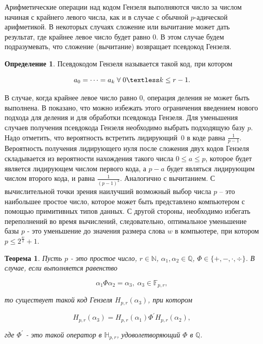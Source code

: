 \documentclass[master, och, diploma, times]{sty/SCWorks}
\theoremstyle{plain}
\newtheorem{thethm}{Теорема}[section]
\theoremstyle{definition}
\newtheorem{defn}{Определение}[section]
\numberwithin{equation}{section}
\begin{document}
Арифметические операции над кодом Гензеля выполняются число за числом начиная с крайнего левого числа, как и в случае с обычной $p$-адической арифметикой. В некоторых случаях сложение или вычитание может дать результат, где крайнее левое число будет равно $0$. В этом случае будем подразумевать, что сложение (вычитание) возвращает псевдокод Гензеля.

\begin{defn}
Псевдокодом Гензеля называется такой код, при котором

\begin{equation}
a_0=\dots=a_k \; \forall \; 0 \textless k \leq r-1.
\end{equation}

\end{defn}

В случае, когда крайнее левое число равно $0$, операция деления не может быть выполнена. В \cite{bib:numbers:limongelli} показано, что можно избежать этого ограничения \mbox{введением} нового подхода для деления и для обработки псевдокода \mbox{Гензеля}.
Для уменьшения случаев получения псевдокода Гензеля \mbox{необходимо} выбрать подходящую базу $p$. Надо отметить, что вероятность встретить \mbox{лидирующий $0$} в коде равна $\frac{1}{p-1}$. Вероятность получения лидирующего нуля после \mbox{сложения} двух кодов Гензеля складывается из вероятности нахождения такого числа $0 \leq a \leq p$, которое будет является лидирующем числом первого кода, а $p-a$ будет являться лидирующим числом второго кода, и равна $\frac{1}{{(p-1)}^{2}}$. Аналогично с вычитанием. С вычислительной точки зрения наилучший возможный выбор числа $p$ -- это наибольшее простое число, которое может быть представлено компьютером с помощью примитивных типов данных. С другой стороны, необходимо избегать переполнений во время вычислений, следовательно, оптимальное уменьшение базы $p$ - это уменьшение до значения размера слова $w$ в компьютере, при котором $p \leq 2^\frac{w}{2}+1$.

\begin{thethm}\label{th:hensel}
Пусть $p$ - это простое число, $r \in \mathbb{N}$, $\alpha_1, \alpha_2 \in \mathbb{Q}$, $\Phi \in \{+, -, \cdot , \div \}$. В случае, если выполняется равенство

\begin{equation}
\alpha_1\Phi \alpha_2 = \alpha_3, \; \alpha_3 \in \mathbb{F}_{p,r},
\end{equation}

\noindent то существует такой код Гензеля $H_{p,r}(\alpha_3)$, при котором

\begin{equation}
H_{p,r}(\alpha_3)=H_{p,r}(\alpha_1)\Phi^{'}H_{p,r}(\alpha_2),
\end{equation}

\noindent где $\Phi^{'}$ - это такой оператор в $\mathbb{H}_{p,r}$, удоволетворяющий $\Phi$ в $\mathbb{Q}$.

\end{thethm}
\end{document}
